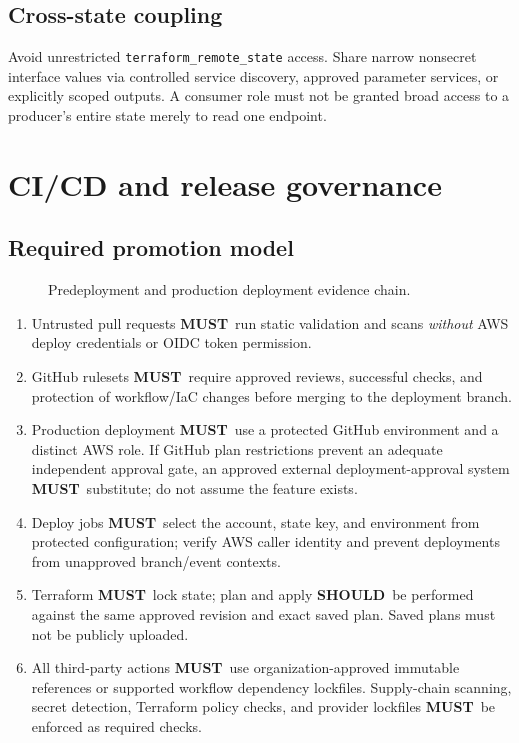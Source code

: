 \documentclass[10pt,letterpaper]{article}
\newcommand{\must}{\textbf{MUST}}
\newcommand{\should}{\textbf{SHOULD}}
\begin{document}
\subsection{Cross-state coupling}
Avoid unrestricted \texttt{terraform\_remote\_state} access. Share narrow nonsecret interface values via controlled service discovery, approved parameter services, or explicitly scoped outputs. A consumer role must not be granted broad access to a producer's entire state merely to read one endpoint.

\section{CI/CD and release governance}
\subsection{Required promotion model}
\begin{figure}[htbp]\centering\resizebox{0.98\linewidth}{!}{}\caption{Predeployment and production deployment evidence chain.}\end{figure}
\begin{enumerate}
\item Untrusted pull requests \must\ run static validation and scans \emph{without} AWS deploy credentials or OIDC token permission.
\item GitHub rulesets \must\ require approved reviews, successful checks, and protection of workflow/IaC changes before merging to the deployment branch.
\item Production deployment \must\ use a protected GitHub environment and a distinct AWS role. If GitHub plan restrictions prevent an adequate independent approval gate, an approved external deployment-approval system \must\ substitute; do not assume the feature exists.
\item Deploy jobs \must\ select the account, state key, and environment from protected configuration; verify AWS caller identity and prevent deployments from unapproved branch/event contexts.
\item Terraform \must\ lock state; plan and apply \should\ be performed against the same approved revision and exact saved plan. Saved plans must not be publicly uploaded.
\item All third-party actions \must\ use organization-approved immutable references or supported workflow dependency lockfiles. Supply-chain scanning, secret detection, Terraform policy checks, and provider lockfiles \must\ be enforced as required checks.
\end{enumerate}
\end{document}
